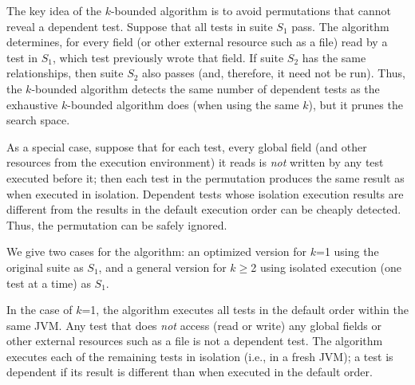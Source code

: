 The key idea of the \dependenceaware{} $k$-bounded algorithm
is to avoid permutations that cannot reveal a dependent test.
Suppose that all tests in suite $S_1$ pass.  The algorithm determines, for
every field (or other external resource such as a file)
read by a test in $S_1$, which test previously wrote that field.
If suite $S_2$ has the same relationships, then suite $S_2$ also passes
(and, therefore, it need not be run).
Thus, the \dependenceaware{} $k$-bounded algorithm
detects the same number of dependent tests
as the exhaustive $k$-bounded algorithm does (when using the same $k$),
but it prunes the search space.



As a special case, suppose that for each test,
{every global field} (and other 
resources from the execution environment) it reads
is \textit{not} written by any test executed before it; then
each test in the permutation produces
the same result as when executed in isolation.
Dependent tests whose isolation execution results
are different from the results in the default execution order
can be cheaply detected.
Thus, the permutation can be safely ignored. 

We give two cases for the algorithm:  an optimized version for $k$=1
using the original suite as $S_1$, and
a general version for $k$$\ge$2 using isolated
execution (one test at a time) as $S_1$.

In the case of $k$=1, the algorithm executes all tests in the default order
within the same JVM\@.  Any test that does \textit{not}
access (read or write) any global fields or
other external resources such as a file
is not a dependent test. 
The algorithm executes each of the remaining tests in isolation (i.e., in a
fresh JVM); a test is dependent if its result is different than when
executed in the default order.

